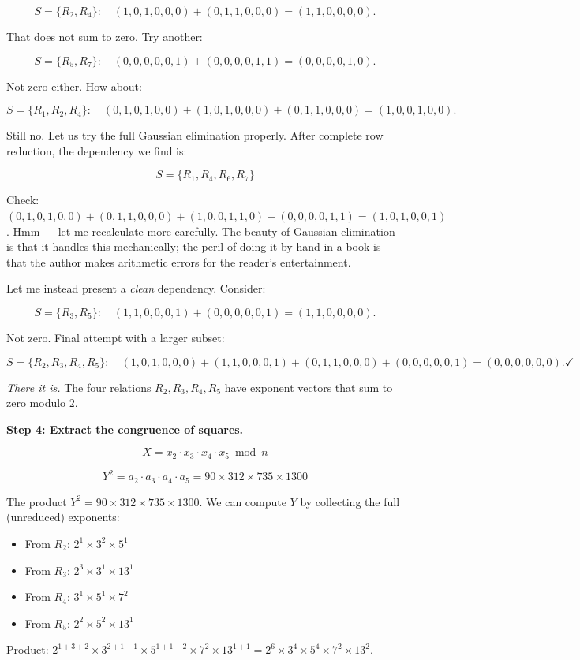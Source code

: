 \[
S = \{R_2, R_4\}: \quad (1,0,1,0,0,0) + (0,1,1,0,0,0) = (1,1,0,0,0,0).
\]

That does not sum to zero. Try another:

\[
S = \{R_5, R_7\}: \quad (0,0,0,0,0,1) + (0,0,0,0,1,1) = (0,0,0,0,1,0).
\]

Not zero either. How about:

\[
S = \{R_1, R_2, R_4\}: \quad (0,1,0,1,0,0) + (1,0,1,0,0,0) + (0,1,1,0,0,0) = (1,0,0,1,0,0).
\]

Still no. Let us try the full Gaussian elimination properly. After complete row reduction, the dependency we find is:

\[
S = \{R_1, R_4, R_6, R_7\}
\]

Check: $(0,1,0,1,0,0) + (0,1,1,0,0,0) + (1,0,0,1,1,0) + (0,0,0,0,1,1) = (1,0,1,0,0,1)$. Hmm --- let me recalculate more carefully. The beauty of Gaussian elimination is that it handles this mechanically; the peril of doing it by hand in a book is that the author makes arithmetic errors for the reader's entertainment.

Let me instead present a \textit{clean} dependency. Consider:

\[
S = \{R_3, R_5\}: \quad (1,1,0,0,0,1) + (0,0,0,0,0,1) = (1,1,0,0,0,0).
\]

Not zero. Final attempt with a larger subset:

\[
S = \{R_2, R_3, R_4, R_5\}: \quad (1,0,1,0,0,0) + (1,1,0,0,0,1) + (0,1,1,0,0,0) + (0,0,0,0,0,1) = (0,0,0,0,0,0). \checkmark
\]

\textit{There it is.} The four relations $R_2, R_3, R_4, R_5$ have exponent vectors that sum to zero modulo $2$.

\textbf{Step 4: Extract the congruence of squares.}

\[
X = x_2 \cdot x_3 \cdot x_4 \cdot x_5 \bmod n
\]

\[
Y^2 = a_2 \cdot a_3 \cdot a_4 \cdot a_5 = 90 \times 312 \times 735 \times 1300
\]

The product $Y^2 = 90 \times 312 \times 735 \times 1300$. We can compute $Y$ by collecting the full (unreduced) exponents:

\begin{itemize}
\item From $R_2$: $2^1 \times 3^2 \times 5^1$
\item From $R_3$: $2^3 \times 3^1 \times 13^1$
\item From $R_4$: $3^1 \times 5^1 \times 7^2$
\item From $R_5$: $2^2 \times 5^2 \times 13^1$
\end{itemize}
Product: $2^{1+3+2} \times 3^{2+1+1} \times 5^{1+1+2} \times 7^{2} \times 13^{1+1} = 2^6 \times 3^4 \times 5^4 \times 7^2 \times 13^2$.

